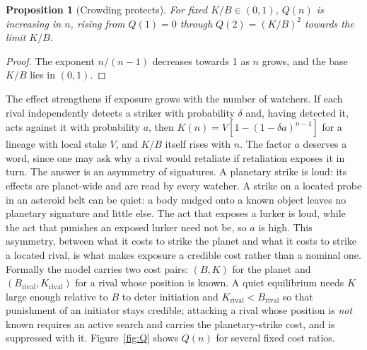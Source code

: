 \documentclass[preprint,12pt]{elsarticle}
\newtheorem{proposition}{Proposition}
\theoremstyle{definition}
\begin{document}
\begin{proposition}[Crowding protects]
\label{prop:crowding}
For fixed $K/B \in (0,1)$, $Q(n)$ is increasing in $n$, rising from $Q(1) = 0$ through $Q(2) = (K/B)^{2}$ towards the limit $K/B$.
\end{proposition}

\begin{proof}
The exponent $n/(n-1)$ decreases towards 1 as $n$ grows, and the base $K/B$ lies in $(0,1)$.
\end{proof}

The effect strengthens if exposure grows with the number of watchers. If each rival independently detects a striker with probability $\delta$ and, having detected it, acts against it with probability $a$, then $K(n) = V[1 - (1-\delta a)^{n-1}]$ for a lineage with local stake $V$, and $K/B$ itself rises with $n$. The factor $a$ deserves a word, since one may ask why a rival would retaliate if retaliation exposes it in turn. The answer is an asymmetry of signatures. A planetary strike is loud: its effects are planet-wide and are read by every watcher. A strike on a located probe in an asteroid belt can be quiet: a body nudged onto a known object leaves no planetary signature and little else. The act that exposes a lurker is loud, while the act that punishes an exposed lurker need not be, so $a$ is high. This asymmetry, between what it costs to strike the planet and what it costs to strike a located rival, is what makes exposure a credible cost rather than a nominal one. Formally the model carries two cost pairs: $(B, K)$ for the planet and $(B_{\mathrm{rival}}, K_{\mathrm{rival}})$ for a rival whose position is known. A quiet equilibrium needs $K$ large enough relative to $B$ to deter initiation and $K_{\mathrm{rival}} < B_{\mathrm{rival}}$ so that punishment of an initiator stays credible; attacking a rival whose position is \emph{not} known requires an active search and carries the planetary-strike cost, and is suppressed with it. Figure~\ref{fig:Q} shows $Q(n)$ for several fixed cost ratios.
\end{document}
